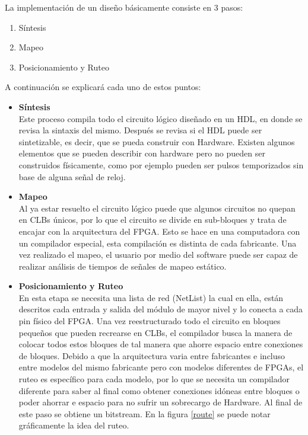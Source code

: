 \documentclass[twoside,spanish,ESP,MSc]{plantillaLabUPV}
\theoremstyle{definition}
\begin{document}
La implementación de un diseño básicamente consiste en 3 pasos:

\begin{enumerate}
\item Síntesis
\item Mapeo
\item Posicionamiento y Ruteo \\
\end{enumerate}

A continuación se explicará cada uno de estos puntos:

\begin{itemize}

\item \textbf{Síntesis}\\
Este proceso compila todo el circuito lógico diseñado en un HDL, en donde se revisa la sintaxis del mismo. Después se revisa si el HDL puede ser sintetizable, es decir, que se pueda construir con Hardware. Existen algunos elementos que se pueden describir con hardware pero no pueden ser construidos físicamente, como por ejemplo pueden ser pulsos temporizados sin base de alguna señal de reloj.\\

\item \textbf{Mapeo}\\
Al ya estar resuelto el circuito lógico puede que algunos circuitos no quepan en CLBs únicos, por lo que el circuito se divide en sub-bloques y trata de encajar con la arquitectura del FPGA. Esto se hace en una computadora con un compilador especial, esta compilación es distinta de cada fabricante. Una vez realizado el mapeo, el usuario por medio del software puede ser capaz de realizar análisis de tiempos de señales de mapeo estático.\\

\item \textbf{Posicionamiento y Ruteo} \\
En esta etapa se necesita una lista de red (NetList) la cual en ella, están descritos cada entrada y salida del módulo de mayor nivel y lo conecta a cada pin físico del FPGA.
Una vez reestructurado todo el circuito en bloques pequeños que pueden recrearse en CLBs, el compilador busca la manera de colocar todos estos bloques de tal manera que ahorre espacio entre conexiones de bloques. Debido a que la arquitectura varia entre fabricantes e incluso entre modelos del mismo fabricante pero con modelos diferentes de FPGAs, el ruteo es específico para cada modelo, por lo que se necesita un compilador diferente para saber al final como obtener conexiones idóneas entre bloques o poder ahorrar e espacio para no sufrir un sobrecargo de Hardware. Al final de este paso se obtiene un bitstream. En la figura \ref{route} se puede notar gráficamente la idea del ruteo.\\


\end{itemize}
\end{document}

